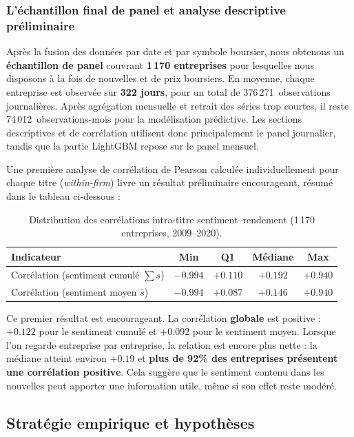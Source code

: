 \documentclass[11pt,a4paper]{article}
\begin{document}
\subsubsection{L'échantillon final de panel et analyse descriptive préliminaire}
Après la fusion des données par date et par symbole boursier, nous obtenons un \textbf{échantillon de panel} couvrant \textbf{1\,170 entreprises} pour lesquelles nous disposons à la fois de nouvelles et de prix boursiers. En moyenne, chaque entreprise est observée sur \textbf{322 jours}, pour un total de 376\,271~observations journalières. Après agrégation mensuelle et retrait des séries trop courtes, il reste 74\,012~observations-mois pour la modélisation prédictive. Les sections descriptives et de corrélation utilisent donc principalement le panel journalier, tandis que la partie LightGBM repose sur le panel mensuel.

Une première analyse de corrélation de Pearson calculée individuellement pour chaque titre (\textit{within-firm}) livre un résultat préliminaire encourageant, résumé dans le tableau ci-dessous :

\begin{table}[H]
\centering
\begin{tabular}{lcccc}
\toprule
\textbf{Indicateur} & \textbf{Min} & \textbf{Q1} & \textbf{Médiane} & \textbf{Max} \\
\midrule
Corrélation (sentiment cumulé $\sum s$) & $-0.994$ & $+0.110$ & $+0.192$ & $+0.940$ \\
Corrélation (sentiment moyen $\bar{s}$) & $-0.994$ & $+0.087$ & $+0.146$ & $+0.940$ \\
\bottomrule
\end{tabular}
\caption{Distribution des corrélations intra-titre sentiment--rendement (1\,170 entreprises, 2009--2020).}
\label{tab:corr_desc}
\end{table}

Ce premier résultat est encourageant. La corrélation \textbf{globale} est positive : $+0.122$ pour le sentiment cumulé et $+0.092$ pour le sentiment moyen. Lorsque l'on regarde entreprise par entreprise, la relation est encore plus nette : la médiane atteint environ $+0.19$ et \textbf{plus de 92\% des entreprises présentent une corrélation positive}. Cela suggère que le sentiment contenu dans les nouvelles peut apporter une information utile, même si son effet reste modéré.

\subsection{Stratégie empirique et hypothèses}
\label{sec:strat_emp}
\end{document}
